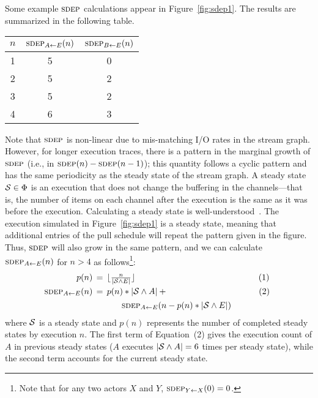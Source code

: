 Some example $\textsc{sdep}$ calculations appear in Figure~\ref{fig:sdep1}.
The results are summarized in the following table.
\begin{center}
\begin{tabular}{|c|c|c|}
\hline
$n$ & $\sdepf{A}{E}(n)$ & $\sdepf{B}{E}(n)$ \\
\hline \hline
1 & 5 & 0 \\ \hline
2 & 5 & 2 \\ \hline
3 & 5 & 2 \\ \hline
4 & 6 & 3 \\ \hline
\end{tabular}
\end{center}
Note that $\textsc{sdep}$ is non-linear due to mis-matching I/O rates in the
stream graph.  However, for longer execution traces, there is a
pattern in the marginal growth of $\textsc{sdep}$ (i.e., in $\textsc{sdep}(n) -
\textsc{sdep}(n-1)$); this quantity follows a cyclic pattern and has the same
periodicity as the steady state of the stream graph.  A steady state
${\cal S} \in \Phi$ is an execution that does not change the buffering
in the channels---that is, the number of items on each channel after
the execution is the same as it was before the execution.  Calculating
a steady state is well-understood~\cite{LM87-i}.  The execution
simulated in Figure~\ref{fig:sdep1} is a steady state, meaning that
additional entries of the pull schedule will repeat the pattern given
in the figure.  Thus, $\textsc{sdep}$ will also grow in the same pattern, and
we can calculate $\sdepf{A}{E}(n)$ for $n > 4$ as
follows\footnote{Note that for any two actors $X$ and $Y$,
$\sdepf{Y}{X}(0) = 0$.}:
\begin{equation}
\label{eq:sdep-steady}
\nonumber
\hspace{-4.5pt}\begin{array}{rcl}
p(n) \hspace{-5.5pt}&=&\hspace{-5.5pt} \lfloor \frac{n}{|{\cal S} \wedge E|} \rfloor~~~~~~~~~~~~~~~~~~~~~~~~~~~~~~~~~~\hspace{1.3pt}~~~~~~~~~(1) \\[1Ex] %
\sdepf{A}{E}(n) \hspace{-5.5pt}&=&\hspace{-5.5pt} p(n) * |{\cal S} \wedge A| + ~~~~~~~~~~~~~~~~~~~~~~~~~~~~~\hspace{3.3pt}~~(2)\\[1Ex]
~&~&\mbox{~}\hspace{8.5pt} \sdepf{A}{E}(n - p(n) * |{\cal S} \wedge E|)
\end{array}
\end{equation}
where ${\cal S}$ is a steady state and $p(n)$ represents the number of
completed steady states by execution $n$.  The first term of
Equation~(2) gives the execution count of $A$ in previous steady
states ($A$ executes $|{\cal S} \wedge A| = 6$ times per steady
state), while the second term accounts for the current steady state.

